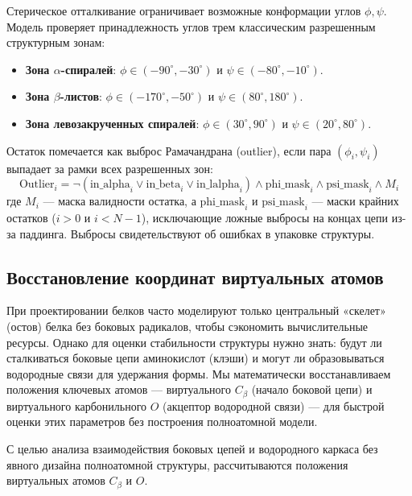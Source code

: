 \documentclass[12pt, a4paper]{article}
\begin{document}
Стерическое отталкивание ограничивает возможные конформации углов $\phi, \psi$. Модель проверяет принадлежность углов трем классическим разрешенным структурным зонам:
\begin{itemize}
    \item \textbf{Зона $\alpha$-спиралей}: $\phi \in (-90^\circ, -30^\circ)$ и $\psi \in (-80^\circ, -10^\circ)$.
    \item \textbf{Зона $\beta$-листов}: $\phi \in (-170^\circ, -50^\circ)$ и $\psi \in (80^\circ, 180^\circ)$.
    \item \textbf{Зона левозакрученных спиралей}: $\phi \in (30^\circ, 90^\circ)$ и $\psi \in (20^\circ, 80^\circ)$.
\end{itemize}
Остаток помечается как выброс Рамачандрана (outlier), если пара $(\phi_i, \psi_i)$ выпадает за рамки всех разрешенных зон:
\begin{equation}
    \text{Outlier}_i = \neg \left( \text{in\_alpha}_i \lor \text{in\_beta}_i \lor \text{in\_lalpha}_i \right) \land \text{phi\_mask}_i \land \text{psi\_mask}_i \land M_i
\end{equation}
где $M_i$ — маска валидности остатка, а $\text{phi\_mask}_i$ и $\text{psi\_mask}_i$ — маски крайних остатков ($i > 0$ и $i < N-1$), исключающие ложные выбросы на концах цепи из-за паддинга. Выбросы свидетельствуют об ошибках в упаковке структуры.

\subsection{Восстановление координат виртуальных атомов}
При проектировании белков часто моделируют только центральный «скелет» (остов) белка без боковых радикалов, чтобы сэкономить вычислительные ресурсы. Однако для оценки стабильности структуры нужно знать: будут ли сталкиваться боковые цепи аминокислот (клэши) и могут ли образовываться водородные связи для удержания формы. Мы математически восстанавливаем положения ключевых атомов — виртуального $C_\beta$ (начало боковой цепи) и виртуального карбонильного $O$ (акцептор водородной связи) — для быстрой оценки этих параметров без построения полноатомной модели.

С целью анализа взаимодействия боковых цепей и водородного каркаса без явного дизайна полноатомной структуры, рассчитываются положения виртуальных атомов $C_\beta$ и $O$.
\end{document}
